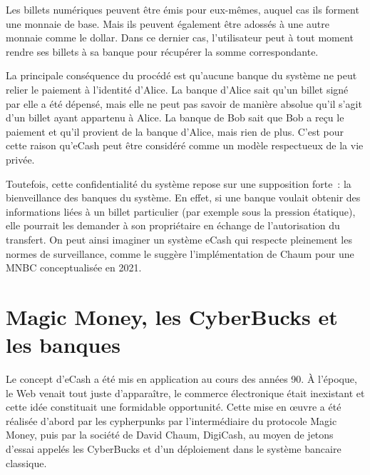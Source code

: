 Les billets numériques peuvent être émis pour eux-mêmes, auquel cas ils forment une monnaie de base. Mais ils peuvent également être adossés à une autre monnaie comme le dollar. Dans ce dernier cas, l'utilisateur peut à tout moment rendre ses billets à sa banque pour récupérer la somme correspondante.

La principale conséquence du procédé est qu'aucune banque du système ne peut relier le paiement à l'identité d'Alice. La banque d'Alice sait qu'un billet signé par elle a été dépensé, mais elle ne peut pas savoir de manière absolue qu'il s'agit d'un billet ayant appartenu à Alice. La banque de Bob sait que Bob a reçu le paiement et qu'il provient de la banque d'Alice, mais rien de plus. C'est pour cette raison qu'eCash peut être considéré comme un modèle respectueux de la vie privée.

Toutefois, cette confidentialité du système repose sur une supposition forte~: la bienveillance des banques du système. En effet, si une banque voulait obtenir des informations liées à un billet particulier (par exemple sous la pression étatique), elle pourrait les demander à son propriétaire en échange de l'autorisation du transfert. On peut ainsi imaginer un système eCash qui respecte pleinement les normes de surveillance, comme le suggère l'implémentation de Chaum pour une MNBC conceptualisée en 2021.


\section*{Magic Money, les CyberBucks et les banques} %

Le concept d'eCash a été mis en application au cours des années 90. À l'époque, le Web venait tout juste d'apparaître, le commerce électronique était inexistant et cette idée constituait une formidable opportunité. Cette mise en œuvre a été réalisée d'abord par les cypherpunks par l'intermédiaire du protocole Magic Money, puis par la société de David Chaum, DigiCash, au moyen de jetons d'essai appelés les CyberBucks et d'un déploiement dans le système bancaire classique. %

